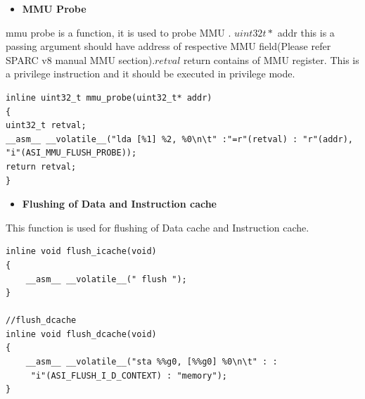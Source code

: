 \documentclass[12pt,a4paper]{article}
\begin{document}
\begin{itemize}
\item \textbf{MMU Probe}
\end{itemize}
mmu probe is a function, it is used to probe MMU . $uint32 t*$ addr this is a passing argument should have address of respective MMU field(Please refer SPARC v8 manual MMU section).$retval$ return contains of MMU register. This is a privilege instruction and  it should be executed in privilege mode.
\begin{lstlisting}
inline uint32_t mmu_probe(uint32_t* addr)
{
uint32_t retval;
__asm__ __volatile__("lda [%1] %2, %0\n\t" :"=r"(retval) : "r"(addr), 
"i"(ASI_MMU_FLUSH_PROBE));
return retval;
}
 \end{lstlisting}

\begin{itemize}
\item \textbf{Flushing of Data and Instruction cache}
\end{itemize}
This function is used for flushing of Data cache and Instruction cache.
\begin{lstlisting}
inline void flush_icache(void)
{
	__asm__ __volatile__(" flush ");
}

//flush_dcache
inline void flush_dcache(void)
{
	__asm__ __volatile__("sta %%g0, [%%g0] %0\n\t" : :
	 "i"(ASI_FLUSH_I_D_CONTEXT) : "memory");
}
 \end{lstlisting}
\end{document}

